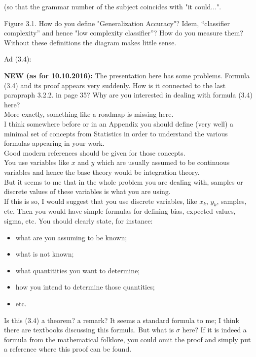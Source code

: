 \documentclass[12pt,reqno]{amsart}
\def\blue#1{{\color{blue} #1}}
\def\red#1{{\color{red} #1}}
\begin{document}
\begin{description}[style=unboxed,leftmargin=0cm,itemsep=3ex]
(so that the grammar number of the subject coincides with "it could...".



\blue{Figure 3.1.}\quad
How do you define "Generalization Accuracy"?
Idem, ``classifier complexity'' and hence "low complexity classifier''?
\red{How do you measure them?}
Without these definitions the diagram makes little sense.

\vspace{1ex}
\blue{Ad (3.4):}\quad
\red{{\bf NEW (as for 10.10.2016):}\quad
The presentation here has some problems.
Formula (3.4) and its proof appears very suddenly.
How is it connected to the last parapraph 3.2.2. in page 35?
Why are you interested in dealing with formula (3.4) here? \\[0.6ex]
More exactly, something like a roadmap is missing here. \\[0.6ex]
I think somewhere before or in an Appendix you should  define (very well) 
a minimal set of concepts from Statistics in order to understand the
various formulas appearing in your work. \\[0.6ex]
Good modern references should be given for those concepts. \\[0.6ex]
You use variables like $x$ and $y$ which are usually assumed to be
continuous variables and hence the base theory would be integration
theory. \\[0.6ex]
But it seems to me that in the whole problem you are dealing with,
samples or discrete values of these variables is what you are using. \\[0.6ex]
If this is so, I would suggest that you use discrete variables, like
$x_k$, $y_k$, samples, etc.
Then you would have simple formulas for defining bias, expected values,
sigma, etc.
You should clearly state, for instance:
\begin{itemize}
\item
what are you assuming to be known;
\item
what is not known;
\item
what quantitities you want to determine;
\item
how you intend to determine those quantities;
\item
etc.
\end{itemize}
}

Is this (3.4) a theorem? a remark?
It seems a standard formula to me;
I think there are textbooks discussing this formula.
But what is $\sigma$ here?
If it is indeed a formula from the mathematical folklore,
you could omit the proof and simply put a reference where this proof
can be found.
           

\end{description}
\end{document}
